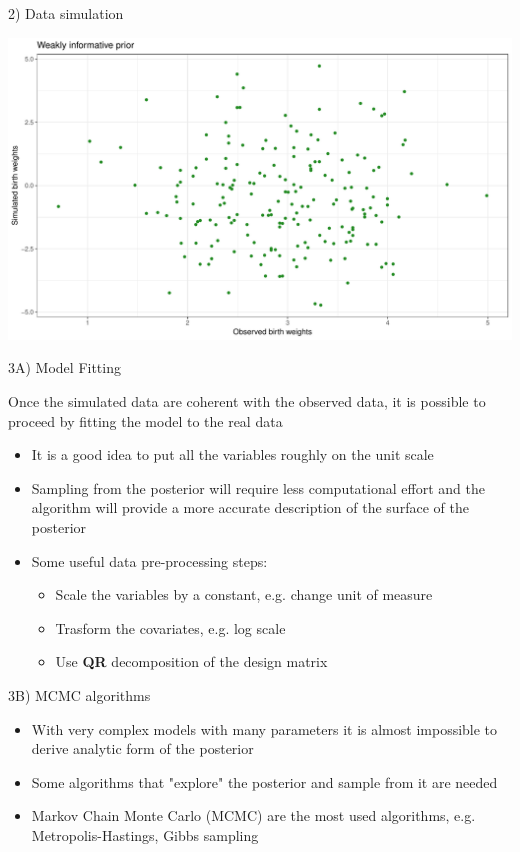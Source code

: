\documentclass[ignorenonframetext,a4paper]{beamer}
\begin{document}
\begin{frame}{2) Data simulation}

\includegraphics{DB_presentation_slides_files/figure-beamer/unnamed-chunk-6-1.pdf}

\end{frame}

\begin{frame}{3A) Model Fitting}

Once the simulated data are coherent with the observed data, it is
possible to proceed by fitting the model to the real data

\begin{itemize}
\setlength\itemsep{1em}
  \item{It is a good idea to put all the variables roughly on the
        unit scale}
  \item{Sampling from the posterior will require less computational
        effort and the algorithm will provide a more accurate 
        description of the surface of the posterior}
  \item{Some useful data pre-processing steps:}
  \begin{itemize}
    \item{Scale the variables by a constant, e.g. change unit of measure}
    \item{Trasform the covariates, e.g. log scale}
    \item{Use \textbf{QR} decomposition of the design matrix}
  \end{itemize}
\end{itemize}

\end{frame}

\begin{frame}{3B) MCMC algorithms}

\begin{itemize}
\setlength\itemsep{1em}
  \item{With very complex models with many parameters it is almost
        impossible to derive analytic form of the posterior}
  \item{Some algorithms that "explore" the posterior and sample from
        it are needed}
  \item{Markov Chain Monte Carlo (MCMC) are the most used algorithms,
        e.g. Metropolis-Hastings, Gibbs sampling}
\end{itemize}

\end{frame}
\end{document}

